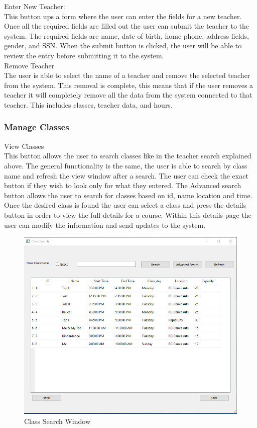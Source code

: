 Enter New Teacher:\\
This button ups a form where the user can enter the fields for a new teacher. Once all the required fields are filled out the user can submit the teacher to the system. The required fields are name, date of birth, home phone, address fields, gender, and SSN. When the submit button is clicked, the user will be able to review the entry before submitting it to the system.\\

Remove Teacher\\
The user is able to select the name of a teacher and remove the selected teacher from the system. This removal is complete, this means that if the user removes a teacher it will completely remove all the data from the system connected to that teacher. This includes classes, teacher data, and hours.\\

\subsubsection{Manage Classes}

View Classes\\
This button allows the user to search classes like in the teacher search explained above. The general functionality is the same, the user is able to search by class name and refresh the view window after a search. The user can check the exact button if they wish to look only for what they entered. The Advanced search button allows the user to search for classes based on id, name location and time. Once the desired class is found the user can select a class and press the details button in order to view the full details for a course. Within this details page the user can modify the information and send updates to the system.\\


\begin{figure}
  \includegraphics[width=\linewidth]{pics/userGuide/classSearch.png}
  \caption{Class Search Window}
  \label{fig:User doc: Class Search}
\end{figure}

